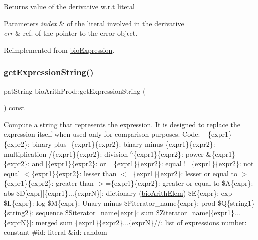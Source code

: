 \begin{DoxyReturn}{Returns}
value of the derivative w.\+r.\+t literal 
\end{DoxyReturn}

\begin{DoxyParams}{Parameters}
{\em index} & of the literal involved in the derivative \\
\hline
{\em err} & ref. of the pointer to the error object. \\
\hline
\end{DoxyParams}


Reimplemented from \hyperlink{classbio_expression_a5915579d1193f25f216c1e273c97f2ce}{bio\+Expression}.

\mbox{\label{classbio_arith_prod_a665209a40bfb01098c5ddde204900294}} 
\subsubsection{\texorpdfstring{get\+Expression\+String()}{getExpressionString()}}
{\footnotesize\ttfamily pat\+String bio\+Arith\+Prod\+::get\+Expression\+String (\begin{DoxyParamCaption}{ }\end{DoxyParamCaption}) const\hspace{0.3cm}{\ttfamily [virtual]}}

Compute a string that represents the expression. It is designed to replace the expression itself when used only for comparison purposes. Code\+: +\{expr1\}\{expr2\}\+: binary plus -\/\{expr1\}\{expr2\}\+: binary minus \{expr1\}\{expr2\}\+: multiplication /\{expr1\}\{expr2\}\+: division $^\wedge$\{expr1\}\{expr2\}\+: power \&\{expr1\}\{expr2\}\+: and $\vert$\{expr1\}\{expr2\}\+: or =\{expr1\}\{expr2\}\+: equal !=\{expr1\}\{expr2\}\+: not equal $<$\{expr1\}\{expr2\}\+: lesser than $<$=\{expr1\}\{expr2\}\+: lesser or equal to $>$\{expr1\}\{expr2\}\+: greater than $>$=\{expr1\}\{expr2\}\+: greater or equal to \$A\{expr\}\+: abs \$D\mbox{[}expr\mbox{]}\mbox{[}\{expr1\}...\{exprN\}\mbox{]}\+: dictionary (\hyperlink{classbio_arith_elem}{bio\+Arith\+Elem}) \$E\{expr\}\+: exp \$L\{expr\}\+: log \$M\{expr\}\+: Unary minus \$\+Piterator\+\_\+name\{expr\}\+: prod \$Q\{string1\}\{string2\}\+: sequence \$\+Siterator\+\_\+name\{expr\}\+: sum \$\+Ziterator\+\_\+name\mbox{[}\{expr1\}...\{exprN\}\mbox{]}\+: merged sum \{expr1\}\{expr2\}...\{exprN\}//\+: list of expressions number\+: constant \#id\+: literal \&id\+: random 

